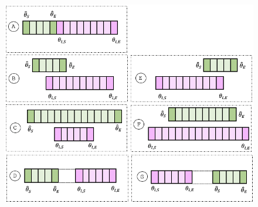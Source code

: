 \documentclass{article}
\begin{document}
\begin{figure}[h!]
	\centering
	\includegraphics[scale=0.55]{become-leader.png}
	\label{fig:become-leader}
\end{figure}
\end{document}
